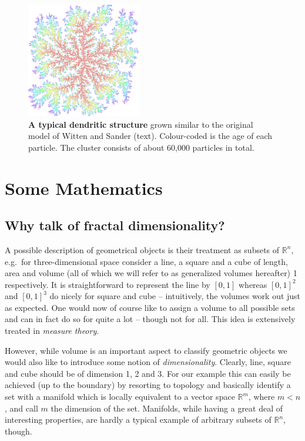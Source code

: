 \documentclass[twocolumn,10pt]{scrartcl}
\begin{document}
        \begin{figure}
            \center
            \includegraphics[width=5cm]{img/wsdendrite.jpg}
            \caption[A typical dendritic structure]
                {\small\textbf{A typical dendritic structure} grown similar to the original model of Witten
                and Sander (text). Colour-coded is the age of each particle. The cluster consists of about
                60,000 particles in total.}
            \label{fig-wsdendrite}
        \end{figure}

    \section{Some Mathematics}
        \subsection{Why talk of fractal dimensionality?}
            A possible description of geometrical objects is their treatment as subsets of $\mathbb{R}^n$, e.g.\ for
            three-dimensional space consider a line, a square and a cube of length, area and volume (all of which we
            will refer to as generalized volumes hereafter) 1 respectively. It is straightforward to represent the line
            by $\left[0,1\right]$ whereas $\left[0,1\right]^2$ and $\left[0,1\right]^3$ do nicely for square and cube
            -- intuitively, the volumes work out just as expected. One would now of course like to assign a 
            volume to all possible sets and can in fact do so for quite a lot -- though not for all. This idea is
            extensively treated in \emph{measure theory}.
            
            However, while volume is an important aspect to classify geometric objects we would also like to
            introduce some notion of \emph{dimensionality}. Clearly, line, square and cube should be of dimension 1, 2
            and 3. For our example this can easily be achieved (up to the boundary) by resorting to topology and
            basically identify a set with a manifold which is locally equivalent to a vector space
            $\mathbb{R}^m$, where $m<n$, and call $m$ the dimension of the set. Manifolds, while having a great deal
            of interesting properties, are hardly a typical example of arbitrary subsets of $\mathbb{R}^n$, though.
            
\end{document}
